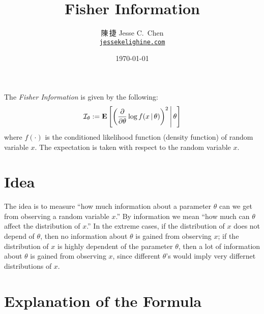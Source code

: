 \documentclass[a4paper,11pt]{article}
\title{Fisher Information}
\author{陳\,捷 Jesse C.\ Chen\\\texttt{\href{https://jessekelighine.com}{jessekelighine.com}}}
\date{\today}
\begin{document}
\maketitle

\noindent
The \emph{Fisher Information} is given by the following:
\begin{align}\label{eq:fisher}
	\mathcal{I}_\theta
	:= \E\left[\left(\frac{\partial}{\partial\theta}\log f(x\given\theta)\right)^2
	\given[\middle]\theta\right]
\end{align}
where $f(\cdot)$ is the conditioned likelihood function (density function)
of random variable $x$.
The expectation is taken with respect to the random variable $x$.

\section{Idea}

The idea is to measure ``how much information about a parameter $\theta$ can
we get from observing a random variable $x$.''
By information we mean ``how much can $\theta$ affect the distribution of $x$.''
In the extreme cases, if the distribution of $x$ does not depend of $\theta$,
then no information about $\theta$ is gained from observing $x$;
if the distribution of $x$ is highly dependent of the parameter	$\theta$,
then a lot of information about $\theta$ is gained from observing $x$,
since different $\theta$'s would imply very differnet distributions of $x$.

\section{Explanation of the Formula}
\end{document}
